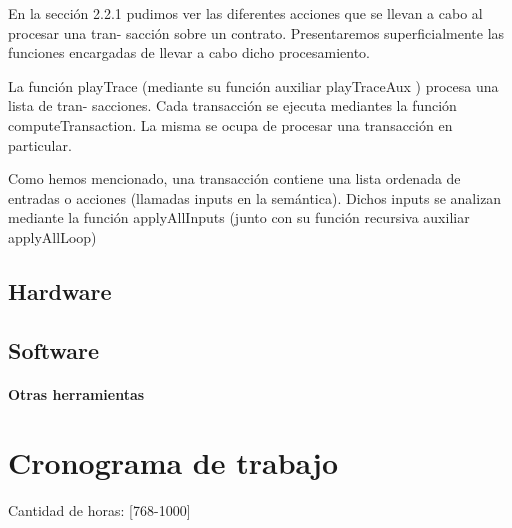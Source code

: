 \documentclass[12pt, oneside]{book}
\begin{document}
En la sección 2.2.1 pudimos ver las diferentes acciones que se llevan a cabo al procesar una tran-
sacción sobre un contrato. Presentaremos superficialmente las funciones encargadas de llevar a
cabo dicho procesamiento.

La función playTrace (mediante su función auxiliar playTraceAux ) procesa una lista de tran-
sacciones. Cada transacción se ejecuta mediantes la función computeTransaction. La misma se
ocupa de procesar una transacción en particular.

Como hemos mencionado, una transacción contiene una lista ordenada de entradas o acciones
(llamadas inputs en la semántica). Dichos inputs se analizan mediante la función applyAllInputs
(junto con su función recursiva auxiliar applyAllLoop)

\section{Hardware}

\section{Software}

\subsubsection{Otras herramientas}


\bigskip


\chapter{Cronograma de trabajo}

Cantidad de horas: [768-1000]

\bigskip
\end{document}
